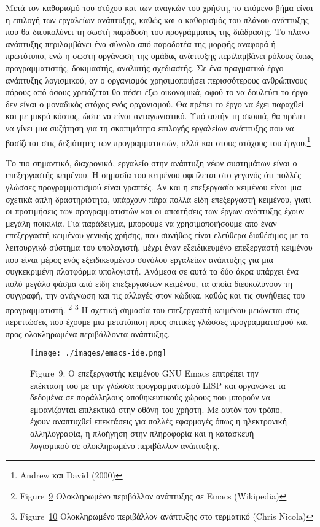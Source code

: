 \documentclass[
]{article}
\begin{document}
Μετά τον καθορισμό του στόχου και των αναγκών του χρήστη, το επόμενο
βήμα είναι η επιλογή των εργαλείων ανάπτυξης, καθώς και ο καθορισμός του
πλάνου ανάπτυξης που θα διευκολύνει τη σωστή παράδοση του προγράμματος
της διάδρασης. Το πλάνο ανάπτυξης περιλαμβάνει ένα σύνολο από παραδοτέα
της μορφής αναφορά ή πρωτότυπο, ενώ η σωστή οργάνωση της ομάδας
ανάπτυξης περιλαμβάνει ρόλους όπως προγραμματιστής, δοκιμαστής,
αναλυτής-σχεδιαστής. Σε ένα πραγματικό έργο ανάπτυξης λογισμικού, αν ο
οργανισμός χρησιμοποιήσει περισσότερους ανθρώπινους πόρους από όσους
χρειάζεται θα πέσει έξω οικονομικά, αφού το να δουλεύει το έργο δεν
είναι ο μοναδικός στόχος ενός οργανισμού. Θα πρέπει το έργο να έχει
παραχθεί και με μικρό κόστος, ώστε να είναι ανταγωνιστικό. Υπό αυτήν τη
σκοπιά, θα πρέπει να γίνει μια συζήτηση για τη σκοπιμότητα επιλογής
εργαλείων ανάπτυξης που να βασίζεται στις δεξιότητες των
προγραμματιστών, αλλά και στους στόχους του έργου.\footnote{Andrew και
  David (2000)}

Το πιο σημαντικό, διαχρονικά, εργαλείο στην ανάπτυξη νέων συστημάτων
είναι ο επεξεργαστής κειμένου. Η σημασία του κειμένου οφείλεται στο
γεγονός ότι πολλές γλώσσες προγραμματισμού είναι γραπτές. Αν και η
επεξεργασία κειμένου είναι μια σχετικά απλή δραστηριότητα, υπάρχουν πάρα
πολλά είδη επεξεργαστή κειμένου, γιατί οι προτιμήσεις των
προγραμματιστών και οι απαιτήσεις των έργων ανάπτυξης έχουν μεγάλη
ποικιλία. Για παράδειγμα, μπορούμε να χρησιμοποιήσουμε από έναν
επεξεργαστή κειμένου γενικής χρήσης, που συνήθως είναι ελεύθερα
διαθέσιμος με το λειτουργικό σύστημα του υπολογιστή, μέχρι έναν
εξειδικευμένο επεξεργαστή κειμένου που είναι μέρος ενός εξειδικευμένου
συνόλου εργαλείων ανάπτυξης για μια συγκεκριμένη πλατφόρμα υπολογιστή.
Ανάμεσα σε αυτά τα δύο άκρα υπάρχει ένα πολύ μεγάλο φάσμα από είδη
επεξεργαστών κειμένου, τα οποία διευκολύνουν τη συγγραφή, την ανάγνωση
και τις αλλαγές στον κώδικα, καθώς και τις συνήθειες του προγραμματιστή.
\footnote{Figure~\protect\hyperlink{fig:emacs-ide}{9} Ολοκληρωμένο
  περιβάλλον ανάπτυξης σε Emacs (Wikipedia)} \footnote{Figure~\protect\hyperlink{fig:vim-ide}{10}
  Ολοκληρωμένο περιβάλλον ανάπτυξης στο τερματικό (Chris Nicola)} Η
σχετική σημασία του επεξεργαστή κειμένου μειώνεται στις περιπτώσεις που
έχουμε μια μετατόπιση προς οπτικές γλώσσες προγραμματισμού και προς
ολοκληρωμένα περιβάλλοντα ανάπτυξης.

\leavevmode{}%
\begin{figure}
\hypertarget{fig:emacs-ide}{%
\centering
\texttt{[image: ./images/emacs-ide.png]}
\caption{Figure~9: Ο επεξεργαστής κειμένου GNU Emacs επιτρέπει την
επέκταση του με την γλώσσα προγραμματισμού LISP και οργανώνει τα
δεδομένα σε παράλληλους αποθηκευτικούς χώρους που μπορούν να
εμφανίζονται επιλεκτικά στην οθόνη του χρήστη. Με αυτόν τον τρόπο, έχουν
αναπτυχθεί επεκτάσεις για πολλές εφαρμογές όπως η ηλεκτρονική
αλληλογραφία, η πλοήγηση στην πληροφορία και η κατασκευή λογισμικού σε
ολοκληρωμένο περιβάλλον ανάπτυξης.}\label{fig:emacs-ide}
}
\end{figure}
\end{document}
